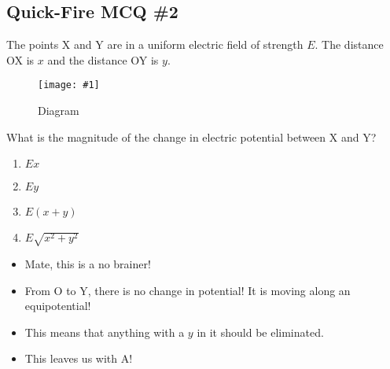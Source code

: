 \documentclass[a4paper,12pt]{article}
\newcommand{\img}[4]{\begin{center}
  \begin{figure}[H]
    \centering
    \texttt{[image: \#1]}
    \caption{#3}
    \label{fig:#4}
  \end{figure}
\end{center}}
\begin{document}
\subsection{Quick-Fire MCQ \#2}

The points X and Y are in a uniform electric field of strength $E$. The distance OX is $x$ and the distance OY is $y$.

\img{ex/9.png}{0.3}{Diagram}{ex9}


What is the magnitude of the change in electric potential between X and Y?

\begin{enumerate}[label=\Alph*.]
  \item $Ex$
  \item $Ey$
  \item $E(x + y)$
  \item $E\sqrt{x^2 + y^2}$
\end{enumerate}

\begin{itemize}
  \item Mate, this is a no brainer!
  \item From O to Y, there is no change in potential! It is moving along an equipotential!
  \item This means that anything with a $y$ in it should be eliminated.
  \item This leaves us with A!
\end{itemize}
\end{document}
